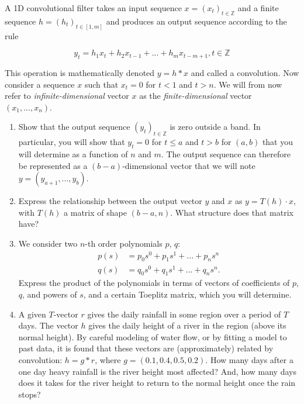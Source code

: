 \documentclass[11pt]{article}
\begin{document}
A 1D convolutional filter takes an input sequence $x = (x_t)_{t \in \mathbb{Z}}$ and a finite sequence $h = (h_t)_{t \in [1, m]}$ and produces an output sequence according to the rule

\[y_t = h_1x_t + h_2x_{t-1} + ... + h_mx_{t-m+1},  t \in \mathbb{Z}\]

This operation is mathematically denoted $y = h * x$ and called a convolution. Now consider a sequence $x$ such that $x_t = 0$ for $t < 1$ and $t > n$. We will from now refer to \emph{infinite-dimensional} vector $x$ as the \emph{finite-dimensional} vector $(x_1, ..., x_n)$.

\begin{enumerate}
    \item Show that the output sequence $(y_t)_{t \in \mathbb{Z}}$ is zero outside a band. In particular, you will show that $y_t = 0$ for $t \leq a$ and $t > b$ for $(a, b)$ that you will determine as a function of $n$ and $m$. The output sequence can therefore be represented as a $(b-a)$-dimensional vector that we will note $y = (y_{a+1}, ..., y_{b})$.

    \item Express the relationship between the output vector $y$ and $x$ as $y = T(h) \cdot x$, with $T(h)$ a matrix of shape $(b-a, n)$. What structure does that matrix have?

    \item We consider two $n$-th order polynomials $p$, $q$:
    \begin{align*}
        p(s) &= p_0s^0 + p_1s^1 + ... + p_ns^n \\
        q(s) &= q_0s^0 + q_1s^1 + ... + q_ns^n.
    \end{align*}
    Express the product of the polynomials in terms of vectors of coefficients of $p$, $q$, and powers of $s$, and a certain Toeplitz matrix, which you will determine.

    \item A given $T$-vector $r$ gives the daily rainfall in some region over a period of $T$ days. The vector $h$ gives the daily height of a river in the region (above its normal height). By careful modeling of water flow, or by fitting a model to past data, it is found that these vectors are (approximately) related by convolution: $h=g*r$, where $g= (0.1,0.4,0.5,0.2)$. How  many days  after a  one day heavy rainfall is the river height most affected? And, how many days does it takes for the river height to return to the normal height once the rain stops?
\end{enumerate}
\end{document}
